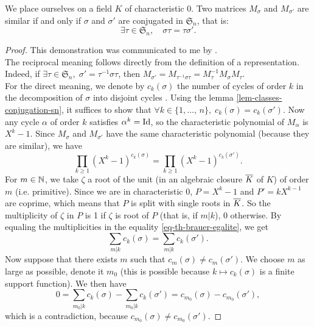 
\begin{thm}
  We place ourselves on a field $K$ of characteristic 0. Two matrices $ M_{\sigma} $ and $ M_{\sigma'} $ are similar if and only if $ \sigma $ and $ \sigma'$ are conjugated in $ \mathfrak{S}_n $, that is:
\begin{equation*}
\exists \tau \in \mathfrak{S}_n, \quad \sigma \tau = \tau \sigma'.
\end{equation*}
\end{thm}
\begin{proof}
This demonstration was communicated to me by . \\The reciprocal meaning follows directly from the definition of a representation. \\Indeed, if $ \exists \tau \in \mathfrak{S}_n, \; \sigma'= \tau^{-1} \sigma \tau $, then $ M_{\sigma'} = M_{\tau^{-1} \sigma \tau} = M_{\tau}^{- 1 } M_{\sigma} M_{\tau} $. \\For the direct meaning, we denote by $ c_k (\sigma) $ the number of cycles of order $ k $ in the decomposition of $ \sigma $ into disjoint cycles . Using the lemma \ref{lem-classes-conjugation-sn}, it suffices to show that $ \forall k \in \{1, \ldots, \, n\}, \; c_k (\sigma) = c_k (\sigma') $. Now any cycle $ \alpha $ of order $ k $ satisfies $ \alpha^k = \operatorname{Id} $, so the characteristic polynomial of $ M_{\alpha} $ is $ X^k - 1 $. Since $ M_{\sigma} $ and $ M_{\sigma'} $ have the same characteristic polynomial (because they are similar), we have
\begin{equation}
\label{eq-th-brauer-egalite}
\prod_{k \geq 1}{(X^{k} - 1)^{c_k (\sigma)}} = \prod_{k \geq 1}{(X^{k} - 1)^{c_k ( \sigma')}}.
\end{equation}
For $ m \in \mathbb{N} $, we take $ \zeta $ a root  of the unit (in an algebraic closure $ \overline{K} $ of $K$) of order $ m $ (i.e. primitive). Since we are in characteristic 0, $ P = X^k - 1 $ and $ P'= k X^{k-1} $ are coprime, which means that $ P $ is split with single roots in $ \overline{K} $. So the multiplicity of $ \zeta $ in $ P $ is 1 if $ \zeta $ is root of $ P $ (that is, if $ m | k $), 0 otherwise. By equaling the multiplicities in the equality \eqref{eq-th-brauer-egalite}, we get
\begin{equation*}
\sum_{m | k}{c_k (\sigma)} = \sum_{m | k}{c_k (\sigma')}.
\end{equation*}
 Now suppose that there exists $ m $ such that $ c_m (\sigma) \neq c_m (\sigma') $. We choose $ m $ as large as possible, denote it $ m_0 $ (this is possible because $ k \mapsto c_k (\sigma) $ is a finite support function). We then have
\begin{equation*}
0 = \sum_{m_0 | k}{c_k (\sigma)} - \sum_{m_0 | k}{c_k (\sigma')} = c_{m_0} (\sigma) - c_{m_0} (\sigma'),
\end{equation*}
which is a contradiction, because $ c_{m_0} (\sigma) \neq c_{m_0} (\sigma') $.
\end{proof}
 
